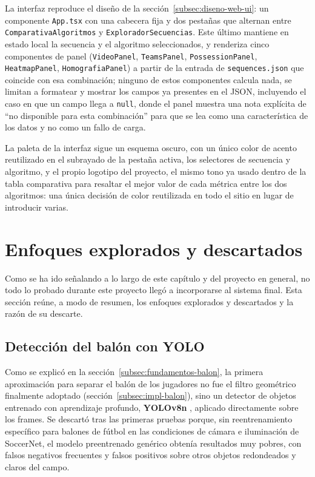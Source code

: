 La interfaz reproduce el diseño de la
sección~\ref{subsec:diseno-web-ui}: un componente \texttt{App.tsx} con
una cabecera fija y dos pestañas que
alternan entre \texttt{ComparativaAlgoritmos} y
\texttt{ExploradorSecuencias}. Este último mantiene en estado local la
secuencia y el algoritmo seleccionados, y renderiza cinco componentes de
panel (\texttt{VideoPanel}, \texttt{TeamsPanel}, \texttt{PossessionPanel},
\texttt{HeatmapPanel}, \texttt{HomografiaPanel}) a partir de la entrada de
\texttt{sequences.json} que coincide con esa combinación; ninguno de
estos componentes calcula nada, se limitan a formatear y mostrar los
campos ya presentes en el JSON, incluyendo el caso en que un campo llega
a \texttt{null}, donde el panel muestra una nota explícita de
\enquote{no disponible para esta combinación} para que se lea como una
característica de los datos y no como un fallo de carga.

La paleta de la interfaz sigue un esquema oscuro, con un único color de
acento reutilizado en el subrayado de la pestaña
activa, los selectores de secuencia y algoritmo, y el propio logotipo del
proyecto, el mismo tono ya usado dentro de la tabla comparativa para
resaltar el mejor valor de cada métrica entre los dos algoritmos: una
única decisión de color reutilizada en todo el sitio en lugar de
introducir varias.

\section{Enfoques explorados y descartados}
\label{sec:implementacion-descartados}

Como se ha ido señalando a lo largo de este capítulo y del
proyecto en general, no todo lo probado durante este proyecto
llegó a incorporarse al sistema final. Esta sección reúne, a modo de
resumen, los enfoques explorados y descartados y la
razón de su descarte.

\subsection{Detección del balón con YOLO}
\label{subsec:impl-yolo}

Como se explicó en la sección~\ref{subsec:fundamentos-balon}, la primera
aproximación para separar el balón de los jugadores no fue el filtro
geométrico finalmente adoptado
(sección~\ref{subsec:impl-balon}), sino un detector de objetos entrenado
con aprendizaje profundo, \textbf{YOLOv8n} \citep{redmon2016yolo}, aplicado
directamente sobre los frames.
Se descartó tras las primeras pruebas porque, sin
reentrenamiento específico para balones de fútbol en las condiciones de
cámara e iluminación de SoccerNet, el modelo preentrenado genérico obtenía
resultados muy pobres, con falsos negativos frecuentes y falsos positivos
sobre otros objetos redondeados y claros del campo.

